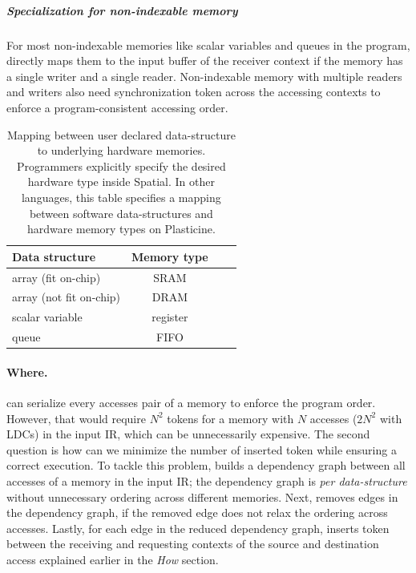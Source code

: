 \subparagraph{Specialization for non-indexable memory}
For most non-indexable memories like scalar variables and queues in the program, \name directly maps
them to the input buffer of the receiver context if the memory has a single writer and a single
reader.
Non-indexable memory with multiple readers and writers also need synchronization token across
the accessing contexts to enforce a program-consistent accessing order.

\begin{table}
  \centering
\begin{tabular}{lccc}
  \toprule
 Data structure & Memory type \\ \midrule
  array (fit on-chip) & SRAM \\
  array (not fit on-chip) & DRAM \\
  scalar variable & register \\
  queue & FIFO \\
 \bottomrule
\end{tabular}
\caption[Mapping between data-structure to hardware memories]{
  Mapping between user declared data-structure to underlying hardware memories. 
  Programmers explicitly specify the desired hardware type inside Spatial. 
  In other languages, this table specifies a mapping between software data-structures 
  and hardware memory types on Plasticine.
}
\label{tab:memtype}
\end{table}

\paragraph{Where.}
\name can serialize every accesses pair of a memory to enforce the program order. However, that
would require $N^2$ tokens for a memory with $N$ accesses ($2N^2$ with LDCs) in the input IR, which can be
unnecessarily expensive.
The second question is how can we minimize the number of inserted token while ensuring a correct execution.
To tackle this problem, \name builds a dependency graph between all accesses of a memory in the input IR; 
the dependency graph is \emph{per data-structure} without unnecessary ordering across different memories.
Next, \name removes edges in the dependency graph, if the removed edge does not relax the ordering
across accesses.
Lastly, for each edge in the reduced dependency graph, \name inserts token between the receiving and
requesting contexts of the source and destination access explained earlier in the \emph{How} section.

